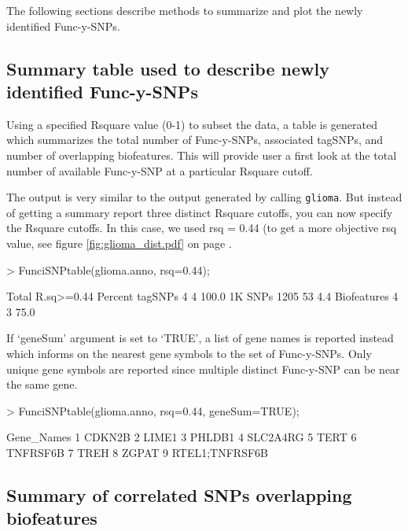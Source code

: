 \documentclass[12pt,fullpage]{article}
\newcommand{\Robject}[1]{{\texttt{#1}}}
\begin{document}
The following sections describe methods to summarize and plot the newly
identified Func-y-SNPs.

\subsection{Summary table used to describe newly identified Func-y-SNPs}

Using a specified Rsquare value (0-1) to subset the data, a table is generated
which summarizes the total number of Func-y-SNPs, associated tagSNPs, and number
of overlapping biofeatures. This will provide user a first look at the total
number of available Func-y-SNP at a particular Rsquare cutoff.

The output is very similar to the output generated by calling \Robject{glioma}.
But instead of getting a summary report three distinct Rsquare cutoffs, you can
now specify the Rsquare cutoffs.  In this case, we used rsq = 0.44 (to get a
        more objective rsq value, see figure \ref{fig:glioma_dist.pdf} on page
        \pageref{fig:glioma_dist.pdf}.

\begin{Schunk}
\begin{Sinput}
> FunciSNPtable(glioma.anno, rsq=0.44);
\end{Sinput}
\begin{Soutput}
            Total R.sq>=0.44 Percent
tagSNPs         4          4   100.0
1K SNPs      1205         53     4.4
Biofeatures     4          3    75.0
\end{Soutput}
\end{Schunk}

If `geneSum' argument is set to `TRUE', a list of gene names is reported
instead which informs on the nearest gene symbols to the set of Func-y-SNPs.
Only unique gene symbols are reported since multiple distinct Func-y-SNP can be
near the same gene.

\begin{Schunk}
\begin{Sinput}
> FunciSNPtable(glioma.anno, rsq=0.44, geneSum=TRUE);
\end{Sinput}
\begin{Soutput}
      Gene_Names
1         CDKN2B
2          LIME1
3         PHLDB1
4       SLC2A4RG
5           TERT
6       TNFRSF6B
7           TREH
8          ZGPAT
9 RTEL1;TNFRSF6B
\end{Soutput}
\end{Schunk}

\subsection{Summary of correlated SNPs overlapping biofeatures}
\end{document}
